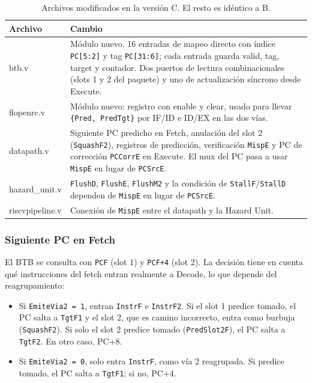 \documentclass[11pt,a4paper]{article}
\newcommand{\sig}[1]{\texttt{#1}}
\begin{document}
\begin{table}[H]
\centering
\small
\begin{tabularx}{\textwidth}{>{\ttfamily}l X}
\toprule
\normalfont\textbf{Archivo} & \textbf{Cambio} \\
\midrule
btb.v & Módulo nuevo. 16 entradas de mapeo directo con índice \sig{PC[5:2]} y tag \sig{PC[31:6]}; cada entrada guarda valid, tag, target y contador. Dos puertos de lectura combinacionales (slots 1 y 2 del paquete) y uno de actualización síncrono desde Execute. \\
flopenrc.v & Módulo nuevo: registro con enable y clear, usado para llevar \sig{\{Pred, PredTgt\}} por IF/ID e ID/EX en las dos vías. \\
datapath.v & Siguiente PC predicho en Fetch, anulación del slot 2 (\sig{SquashF2}), registros de predicción, verificación \sig{MispE} y PC de corrección \sig{PCCorrE} en Execute. El mux del PC pasa a usar \sig{MispE} en lugar de \sig{PCSrcE}. \\
hazard\_unit.v & \sig{FlushD}, \sig{FlushE}, \sig{FlushM2} y la condición de \sig{StallF}/\sig{StallD} dependen de \sig{MispE} en lugar de \sig{PCSrcE}. \\
riscvpipeline.v & Conexión de \sig{MispE} entre el datapath y la Hazard Unit. \\
\bottomrule
\end{tabularx}
\caption{Archivos modificados en la versión C. El resto es idéntico a B.}
\end{table}

\subsubsection{Siguiente PC en Fetch}

El BTB se consulta con \sig{PCF} (slot 1) y \sig{PCF+4} (slot 2). La decisión tiene en cuenta qué instrucciones del fetch entran realmente a Decode, lo que depende del reagrupamiento:
\begin{itemize}[nosep]
  \item Si \sig{EmiteVia2~=~1}, entran \sig{InstrF} e \sig{InstrF2}. Si el slot 1 predice tomado, el PC salta a \sig{TgtF1} y el slot 2, que es camino incorrecto, entra como burbuja (\sig{SquashF2}). Si solo el slot 2 predice tomado (\sig{PredSlot2F}), el PC salta a \sig{TgtF2}. En otro caso, PC+8.
  \item Si \sig{EmiteVia2~=~0}, solo entra \sig{InstrF}, como vía 2 reagrupada. Si predice tomado, el PC salta a \sig{TgtF1}; si no, PC+4.
\end{itemize}
\end{document}
